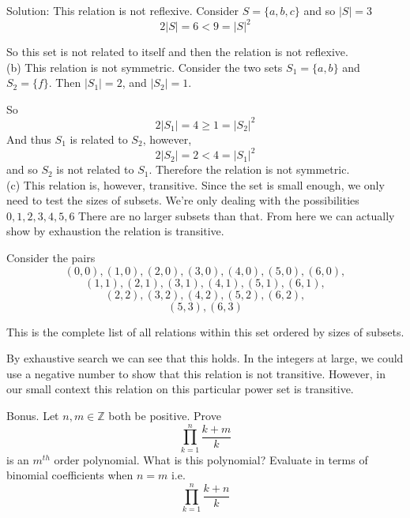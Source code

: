 \documentclass[16 pt]{amsart}
\theoremstyle{definition}
\theoremstyle{remark}
\numberwithin{equation}{subsection}
\newcommand{\Z}{\mathbb{Z}}
\begin{document}
\vspace{1in}

Solution: This relation is not reflexive. Consider $S = \{a,b,c\}$ and so $|S|=3$ 
\[
2|S| = 6 < 9 = |S|^2
\]

So this set is not related to itself and then the relation is not reflexive.\\


(b) This relation is not symmetric.  Consider the two sets $S_1 = \{a,b\}$ and $S_2 = \{f\}$.  Then $|S_1|=2$, and $|S_2|=1$.

So
\[
2|S_1| = 4 \ge 1 = |S_2|^2
\]
And thus $S_1$ is related to $S_2$, however, 
\[
2|S_2| = 2 < 4 = |S_1|^2
\]
and so $S_2$ is not related to $S_1$.  Therefore the relation is not symmetric.\\

(c) This relation is, however, transitive.  Since the set is small enough, we only need to test the sizes of subsets.  We're only dealing with the possibilities $0,1,2,3,4,5,6$ There are no larger subsets than that.  From here we can actually show by exhaustion the relation is transitive.

Consider the pairs 
\[(0,0),(1,0),(2,0),(3,0),(4,0),(5,0),(6,0),\]
\[(1,1),(2,1),(3,1),(4,1),(5,1),(6,1),\]
\[(2,2),(3,2),(4,2),(5,2),(6,2),\]
\[(5,3),(6,3)
\]

This is the complete list of all relations within this set ordered by sizes of subsets.

By exhaustive search we can see that this holds.  In the integers at large, we could use a negative number to show that this relation is not transitive.  However, in our small context this relation on this particular power set is transitive.

\newpage

Bonus. Let $n,m\in\Z$ both be positive. Prove
\[
\prod_{k=1}^{n} \frac{k+m}{k}
\]
is an $m^{th}$ order polynomial.  What is this polynomial? Evaluate in terms of binomial coefficients when $n=m$ i.e.
\[
\prod_{k=1}^{n} \frac{k+n}{k}
\]
\end{document}
